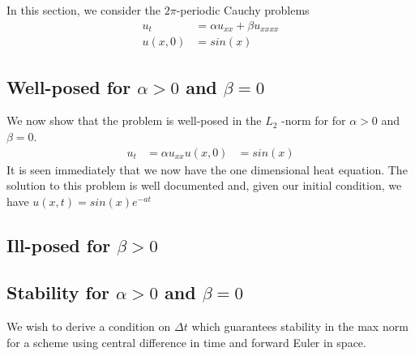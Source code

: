 In this section, we consider the $2\pi$-periodic Cauchy problems
\begin{align*}
u_t &= \alpha u_{xx} + \beta u_{xxxx} \\
u(x,0) &= sin(x)
\end{align*}


\subsection{Well-posed for $\alpha>0$ and $\beta = 0$}
We now show that the problem is well-posed in the $L_2$ -norm for for $\alpha>0$ and $\beta = 0$.
\begin{align*}
u_t &= \alpha u_{xx}
u(x,0) &= sin(x)
\end{align*} 
It is seen immediately that we now have the one dimensional heat equation. The solution to this problem is well documented and, given our initial condition, we have $u(x,t) = sin(x)e^{-at}$  



\subsection{Ill-posed for $\beta>0$}


\subsection{Stability for $\alpha>0$ and $\beta=0$}
We wish to derive a condition on $\Delta t$ which guarantees stability in the max norm for a scheme using central difference in time and forward Euler in space. 
